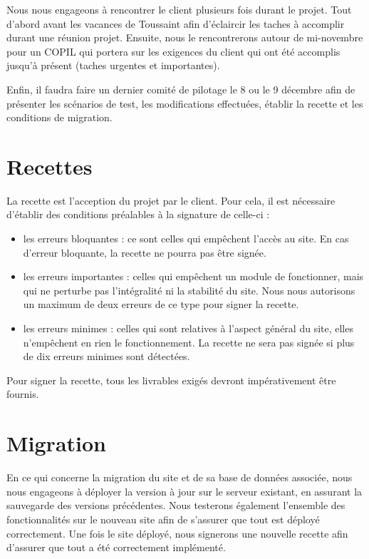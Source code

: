 \documentclass[11pt]{report}
\begin{document}
 \par Nous nous engageons à rencontrer le client plusieurs fois durant le
 projet. Tout d'abord avant les vacances de Toussaint afin d'éclaircir les
 taches à accomplir durant une réunion projet. Ensuite, nous le rencontrerons
 autour de mi-novembre pour un COPIL qui portera sur les exigences du client qui
 ont été accomplis jusqu'à présent (taches urgentes et importantes). 
 \par Enfin, il
 faudra faire un dernier comité de pilotage le 8 ou le 9 décembre afin de
 présenter les scénarios de test, les modifications effectuées, établir la
recette et les conditions de migration.
\section{Recettes}
 La recette est l'acception du projet par le client. Pour cela, il est
nécessaire d'établir des conditions préalables à la signature de celle-ci : \\
\begin{itemize}
 \item les erreurs bloquantes : ce sont celles qui empêchent l'accès au site.
 En cas d'erreur bloquante, la recette ne pourra pas être signée. \\
  \item les erreurs importantes : celles qui empêchent un module de fonctionner,
  mais qui ne perturbe pas l'intégralité ni la stabilité du site. Nous nous
 autorisons un maximum de deux erreurs de ce type pour signer la recette. \\
  \item les erreurs minimes : celles qui sont relatives à l'aspect général du
  site, elles n’empêchent en rien le fonctionnement. La recette ne sera pas
  signée si plus de dix erreurs minimes sont détectées. \\
\end{itemize}

\par Pour signer la recette, tous les livrables exigés devront impérativement
être fournis.

\section{Migration}
 En ce qui concerne la migration du site et de sa base de données associée, nous
 nous engageons à déployer la version à jour sur le serveur existant, en
 assurant la sauvegarde des versions précédentes. Nous testerons également
 l'ensemble des fonctionnalités sur le nouveau site afin de s'assurer que tout
 est déployé correctement.
 Une fois le site déployé, nous signerons une nouvelle recette afin d'assurer
que tout a été correctement implémenté.
\end{document}
